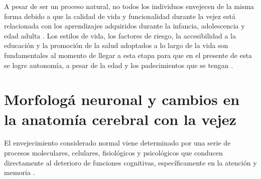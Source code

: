 A pesar de ser un proceso natural, no todos los individuos envejecen de la misma forma debido a 
que la calidad de vida y funcionalidad durante la vejez est\'a relacionada con los aprendizajes 
adquiridos durante la infancia, adolescencia y edad adulta \cite{Ohayon04}. 
Los estilos de vida, los factores de riesgo, la accesibilidad a la educaci\'on y la promoci\'on 
de la salud adoptados a lo largo de la vida son fundamentales al momento de llegar a esta etapa 
para que en el presente de esta se logre autonom\'ia, a pesar de la edad y los padecimientos que 
se tengan \cite{Sanhueza14}.



\section{Morfolog\'a neuronal y cambios en la anatomía cerebral con la vejez}

El envejecimiento considerado normal viene determinado por una serie de procesos moleculares, 
celulares, fisiol\'ogicos y psicol\'ogicos que conducen directamente al deterioro de funciones 
cognitivas, específicamente en la atenci\'on y memoria \cite{Navarrete03,Park09}.

